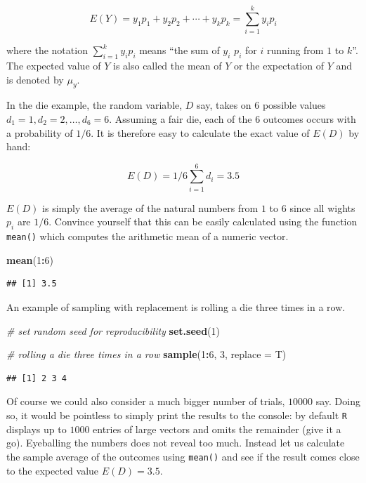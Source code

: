 \documentclass[]{book}
\newenvironment{Shaded}{\begin{snugshade}}{\end{snugshade}}
\newcommand{\KeywordTok}[1]{\textcolor[rgb]{0.13,0.29,0.53}{\textbf{#1}}}
\newcommand{\DataTypeTok}[1]{\textcolor[rgb]{0.13,0.29,0.53}{#1}}
\newcommand{\DecValTok}[1]{\textcolor[rgb]{0.00,0.00,0.81}{#1}}
\newcommand{\CommentTok}[1]{\textcolor[rgb]{0.56,0.35,0.01}{\textit{#1}}}
\newcommand{\OperatorTok}[1]{\textcolor[rgb]{0.81,0.36,0.00}{\textbf{#1}}}
\newcommand{\NormalTok}[1]{#1}
\theoremstyle{definition}
\theoremstyle{definition}
\theoremstyle{definition}
\theoremstyle{remark}
\begin{document}
\[ E(Y) = y_1 p_1 + y_2 p_2 + \cdots + y_k p_k = \sum_{i=1}^k y_i p_i \]

where the notation \(\sum_{i=1}^k y_i p_i\) means ``the sum of \(y_i\)
\(p_i\) for \(i\) running from \(1\) to \(k\)''. The expected value of
\(Y\) is also called the mean of \(Y\) or the expectation of \(Y\) and
is denoted by \(\mu_y\).

In the die example, the random variable, \(D\) say, takes on \(6\)
possible values \(d_1 = 1, d_2 = 2, \dots, d_6 = 6\). Assuming a fair
die, each of the \(6\) outcomes occurs with a probability of \(1/6\). It
is therefore easy to calculate the exact value of \(E(D)\) by hand:

\[ E(D) = 1/6 \sum_{i=1}^6 d_i = 3.5 \]

\(E(D)\) is simply the average of the natural numbers from \(1\) to
\(6\) since all wights \(p_i\) are \(1/6\). Convince yourself that this
can be easily calculated using the function \texttt{mean()} which
computes the arithmetic mean of a numeric vector.

\begin{Shaded}
\begin{Highlighting}[]
\KeywordTok{mean}\NormalTok{(}\DecValTok{1}\OperatorTok{:}\DecValTok{6}\NormalTok{)}
\end{Highlighting}
\end{Shaded}

\begin{verbatim}
## [1] 3.5
\end{verbatim}

An example of sampling with replacement is rolling a die three times in
a row.

\begin{Shaded}
\begin{Highlighting}[]
\CommentTok{# set random seed for reproducibility}
\KeywordTok{set.seed}\NormalTok{(}\DecValTok{1}\NormalTok{)}

\CommentTok{# rolling a die three times in a row}
\KeywordTok{sample}\NormalTok{(}\DecValTok{1}\OperatorTok{:}\DecValTok{6}\NormalTok{, }\DecValTok{3}\NormalTok{, }\DataTypeTok{replace =}\NormalTok{ T)}
\end{Highlighting}
\end{Shaded}

\begin{verbatim}
## [1] 2 3 4
\end{verbatim}

Of course we could also consider a much bigger number of trials,
\(10000\) say. Doing so, it would be pointless to simply print the
results to the console: by default \texttt{R} displays up to \(1000\)
entries of large vectors and omits the remainder (give it a go).
Eyeballing the numbers does not reveal too much. Instead let us
calculate the sample average of the outcomes using \texttt{mean()} and
see if the result comes close to the expected value \(E(D)=3.5\).
\end{document}
